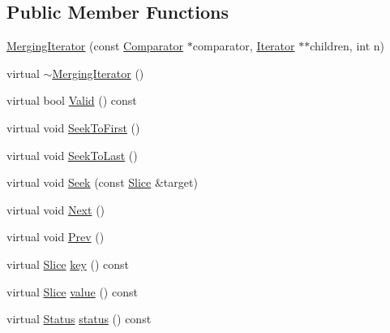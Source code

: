 \subsection*{Public Member Functions}
\begin{DoxyCompactItemize}
\item 
\hyperlink{classleveldb_1_1anonymous__namespace_02merger_8cc_03_1_1_merging_iterator_abc9e8efb276606938f6b4eb7db96fb34}{Merging\+Iterator} (const \hyperlink{structleveldb_1_1_comparator}{Comparator} $\ast$comparator, \hyperlink{classleveldb_1_1_iterator}{Iterator} $\ast$$\ast$children, int n)
\item 
virtual \hyperlink{classleveldb_1_1anonymous__namespace_02merger_8cc_03_1_1_merging_iterator_a4da7fe2c9018dae6396939a13f8ad7b9}{$\sim$\+Merging\+Iterator} ()
\item 
virtual bool \hyperlink{classleveldb_1_1anonymous__namespace_02merger_8cc_03_1_1_merging_iterator_a620efdc6f3254e189a88ac2620243f8c}{Valid} () const 
\item 
virtual void \hyperlink{classleveldb_1_1anonymous__namespace_02merger_8cc_03_1_1_merging_iterator_a7ea577a527b66415075221f5e9aeb85a}{Seek\+To\+First} ()
\item 
virtual void \hyperlink{classleveldb_1_1anonymous__namespace_02merger_8cc_03_1_1_merging_iterator_ac033fb9c53330c02460b7552588fd530}{Seek\+To\+Last} ()
\item 
virtual void \hyperlink{classleveldb_1_1anonymous__namespace_02merger_8cc_03_1_1_merging_iterator_aa5d93cc49369f5fbd24dee00752c9325}{Seek} (const \hyperlink{classleveldb_1_1_slice}{Slice} \&target)
\item 
virtual void \hyperlink{classleveldb_1_1anonymous__namespace_02merger_8cc_03_1_1_merging_iterator_aca2b1445d84bc208065def101f7adae3}{Next} ()
\item 
virtual void \hyperlink{classleveldb_1_1anonymous__namespace_02merger_8cc_03_1_1_merging_iterator_a90b2ef85503b85f4cd400c677fefcbd4}{Prev} ()
\item 
virtual \hyperlink{classleveldb_1_1_slice}{Slice} \hyperlink{classleveldb_1_1anonymous__namespace_02merger_8cc_03_1_1_merging_iterator_ab550733bf777801115b5cf0b248c1a2d}{key} () const 
\item 
virtual \hyperlink{classleveldb_1_1_slice}{Slice} \hyperlink{classleveldb_1_1anonymous__namespace_02merger_8cc_03_1_1_merging_iterator_aac4d0e5e62b3e3aec7c7e4c8467c9fe0}{value} () const 
\item 
virtual \hyperlink{classleveldb_1_1_status}{Status} \hyperlink{classleveldb_1_1anonymous__namespace_02merger_8cc_03_1_1_merging_iterator_ab28b795b8a9431370a781b0e14908946}{status} () const 
\end{DoxyCompactItemize}
